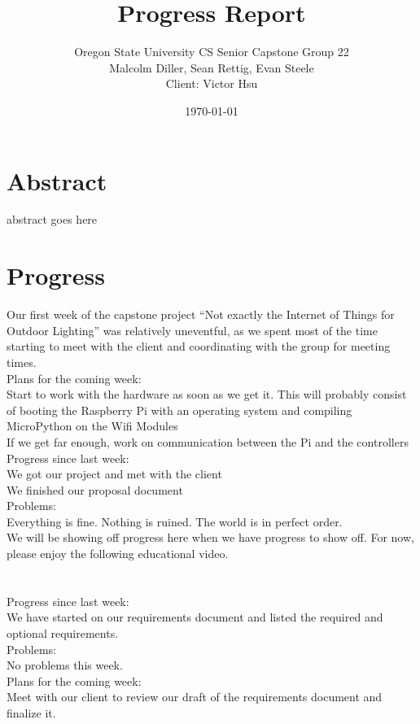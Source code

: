 \documentclass[letterpaper,10pt]{article}
\title{Progress Report}
\author{Oregon State University CS Senior Capstone Group 22\\Malcolm Diller, Sean Rettig, Evan Steele\\Client: Victor Hsu}
\date{\today}
\begin{document}
\maketitle

\section{Abstract}

abstract goes here

\section{Progress}


Our first week of the capstone project ``Not exactly the Internet of Things for Outdoor Lighting​'' was relatively uneventful, as we spent most of the time starting to meet with the client and coordinating with the group for meeting times.​​ \\
Plans for the coming week: \\
​Start to work with the hardware as soon as we get it. This will probably consist of ​booting the Raspberry Pi with an operating system and compiling MicroPython on the Wifi Modules \\
If we get far enough, work on communication between the Pi and the controllers \\
​​​Progress since last week: \\
​We got our project and met with the client \\
We finished our proposal document \\
Problems: \\
​Everything is fine. Nothing is ruined. The world is in perfect order. \\
We will be showing off progress here when we have progress to show off. For now, please enjoy the following educational​ video. \\
 \\
 \\
Progress since last week: \\
​We have started on our requirements document and listed the required and optional requirements. \\
Problems: \\
​No problems this week. \\
​Plans for the coming week: \\
Meet with our client to review our draft of the requirements document and finalize it. \\
\end{document}
